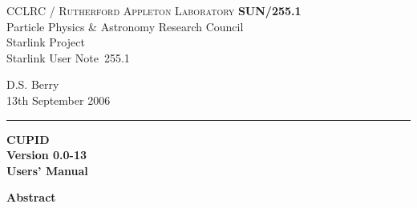 \documentclass[twoside,11pt]{article}
\newcommand{\stardoccategory}  {Starlink User Note}
\newcommand{\stardocinitials}  {SUN}
\newcommand{\stardocnumber}    {255.1}
\newcommand{\stardocauthors}   {D.S. Berry}
\newcommand{\stardocdate}      {13th September 2006}
\newcommand{\stardoctitle}     {CUPID}
\newcommand{\stardocversion}   {Version 0.0-13}
\newcommand{\stardocmanual}    {Users' Manual}
\newcommand{\stardocname}{\stardocinitials /\stardocnumber}
\newenvironment{latexonly}{}{}
\renewcommand{\_}{\texttt{\symbol{95}}}
\begin{document}
\thispagestyle{empty}

\begin{latexonly}
   CCLRC / \textsc{Rutherford Appleton Laboratory} \hfill \textbf{\stardocname}\\
   {\large Particle Physics \& Astronomy Research Council}\\
   {\large Starlink Project\\}
   {\large \stardoccategory\ \stardocnumber}
   \begin{flushright}
   \stardocauthors\\
   \stardocdate
   \end{flushright}
   \vspace{-4mm}
   \rule{\textwidth}{0.5mm}
   \vspace{5mm}
   \begin{center}
   {\Huge\textbf{\stardoctitle \\ [2.5ex]}}
   {\LARGE\textbf{\stardocversion \\ [4ex]}}
   {\Huge\textbf{\stardocmanual}}
   \end{center}
   \vspace{5mm}


   \vspace{5mm}
   \begin{center}
      {\Large\textbf{Abstract}}
   \end{center}
\end{latexonly}
\end{document}

